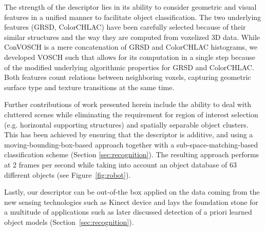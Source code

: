 \documentclass[conference]{sty/IEEEtran}
\begin{document}

The strength of the descriptor lies in its ability to consider geometric and
visual features in a unified manner to facilitate object classification. The two
underlying features (GRSD, ColorCHLAC) have been carefully selected because of 
their similar structures and the way they are computed from voxelized 3D data. 
While ConVOSCH is a mere concatenation of GRSD and ColorCHLAC histograms, we 
developed VOSCH such that allows for its computation in a single step because 
of the modified underlying algorithmic properties for GRSD and ColorCHLAC. 
Both features count relations between neighboring voxels, capturing geometric 
surface type and texture transitions at the same time.

Further contributions of work presented herein include the ability to deal with
cluttered scenes while eliminating the requirement for region of interest
selection (e.g. horizontal supporting structures) and spatially separable object
clusters. This has been achieved by ensuring that the descriptor is additive, and using a
moving-bounding-box-based approach together with a sub-space-matching-based classification scheme (Section
\ref{sec:recognition}). The resulting approach performs at 2 frames per second
while taking into account an object database of 63 different objects
(see Figure~\ref{fig:robot}).




Lastly, our descriptor can be out-of-the box applied on the data coming from the 
new sensing technologies such as Kinect device and lays the foundation stone for a
multitude of applications such as later discussed detection of a priori learned object models
(Section~\ref{sec:recognition}).
\end{document}
